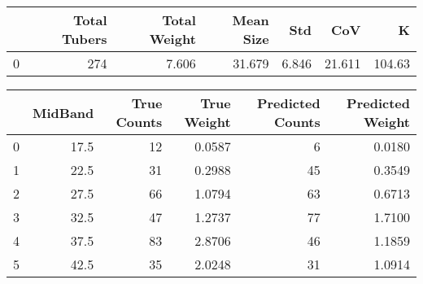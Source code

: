 \begin{tabular}{lrrrrrr}
\toprule
{} &  Total Tubers &  Total Weight &  Mean Size &    Std &     CoV &       K \\
\midrule
0 &           274 &         7.606 &     31.679 &  6.846 &  21.611 &  104.63 \\
\bottomrule
\end{tabular}

\begin{tabular}{lrrrrr}
\toprule
{} &  MidBand &  True Counts &  True Weight &  Predicted Counts &  Predicted Weight \\
\midrule
0 &     17.5 &           12 &       0.0587 &                 6 &            0.0180 \\
1 &     22.5 &           31 &       0.2988 &                45 &            0.3549 \\
2 &     27.5 &           66 &       1.0794 &                63 &            0.6713 \\
3 &     32.5 &           47 &       1.2737 &                77 &            1.7100 \\
4 &     37.5 &           83 &       2.8706 &                46 &            1.1859 \\
5 &     42.5 &           35 &       2.0248 &                31 &            1.0914 \\
\bottomrule
\end{tabular}
